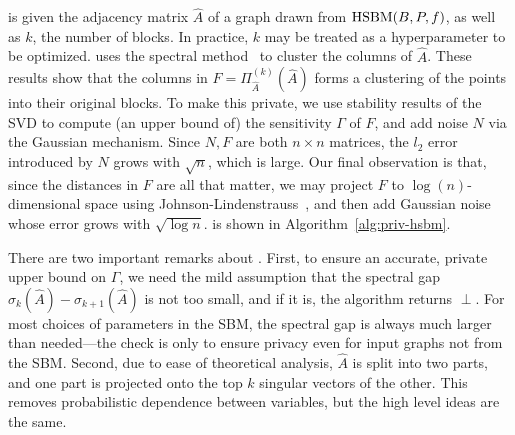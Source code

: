 \dpcom{} is given the adjacency matrix $\hat{A}$ of a graph drawn from $\textnormal{HSBM}(B,P,f)$, as well as $k$, the number of blocks. In practice, $k$ may be treated as a hyperparameter to be optimized. \dpcom{} uses the spectral method~\citep{mcsherry2001spectral, vu2014simple} to cluster the columns of $\hat{A}$. These results show that the columns in $F = \Pi_{\hat{A}}^{(k)}(\hat{A})$ forms a clustering of the points into their original blocks. To make this private, we use stability results of the SVD to compute (an upper bound of) the sensitivity $\Gamma$ of $F$, and add noise $N$ via the Gaussian mechanism. Since $N,F$ are both $n \times n$ matrices, the $l_2$ error introduced by $N$ grows with $\sqrt{n}$, which is large. Our final observation is that, since the distances in $F$ are all that matter, we may project $F$ to $\log(n)$-dimensional space using Johnson-Lindenstrauss~\citep{johnson1984extensions}, and then add Gaussian noise whose error grows with $\sqrt{\log n}$. \dpcom{} is shown in Algorithm~\ref{alg:priv-hsbm}.

There are two important remarks about \dpcom{}. First, to ensure an accurate, private upper bound on $\Gamma$, we need the mild assumption that the spectral gap $\sigma_k(\hat{A}) - \sigma_{k+1}(\hat{A})$ is not too small, and if it is, the algorithm returns $\perp$. For most choices of parameters in the SBM, the spectral gap is always much larger than needed---the check is only to ensure privacy even for input graphs not from the SBM. Second, due to ease of theoretical analysis, $\hat{A}$ is split into two parts, and one part is projected onto the top $k$ singular vectors of the other. This removes probabilistic dependence between variables, but the high level ideas are the same.


